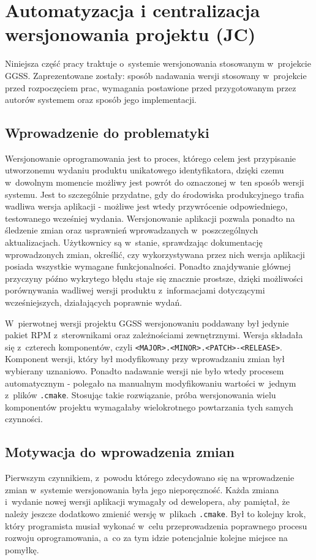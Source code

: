 \clearpage
\section{Automatyzacja i centralizacja wersjonowania projektu (JC)}
\label{ch:versioning}

Niniejsza część pracy traktuje o~systemie wersjonowania stosowanym w~projekcie GGSS. Zaprezentowane zostały: sposób nadawania wersji stosowany w~projekcie przed rozpoczęciem prac, wymagania postawione przed przygotowanym przez autorów systemem oraz sposób jego implementacji.

\subsection{Wprowadzenie do problematyki}
Wersjonowanie oprogramowania jest to proces, którego celem jest przypisanie utworzonemu wydaniu produktu unikatowego identyfikatora, dzięki czemu w~dowolnym momencie możliwy jest powrót do oznaczonej w~ten sposób wersji systemu. Jest to szczególnie przydatne, gdy do środowiska produkcyjnego trafia wadliwa wersja aplikacji - możliwe jest wtedy przywrócenie odpowiedniego, testowanego wcześniej wydania. Wersjonowanie aplikacji pozwala ponadto na śledzenie zmian oraz usprawnień wprowadzanych w~poszczególnych aktualizacjach. Użytkownicy są w~stanie, sprawdzając dokumentację wprowadzonych zmian, określić, czy wykorzystywana przez nich wersja aplikacji posiada wszystkie wymagane funkcjonalności. Ponadto znajdywanie głównej przyczyny późno wykrytego błędu staje się znacznie prostsze, dzięki możliwości porównywania wadliwej wersji produktu z~informacjami dotyczącymi wcześniejszych, działających poprawnie wydań.

W~pierwotnej wersji projektu GGSS wersjonowaniu poddawany był jedynie pakiet RPM z~sterownikami oraz zależnościami zewnętrznymi. Wersja składała się z~czterech komponentów, czyli \lstinline{<MAJOR>.<MINOR>.<PATCH>-<RELEASE>}. Komponent wersji, który był modyfikowany przy wprowadzaniu zmian był wybierany uznaniowo. Ponadto nadawanie wersji nie było wtedy procesem automatycznym - polegało na manualnym modyfikowaniu wartości w~jednym z~plików \lstinline{.cmake}. Stosując takie rozwiązanie, próba wersjonowania wielu komponentów projektu wymagałaby wielokrotnego powtarzania tych samych czynności.

\subsection{Motywacja do wprowadzenia zmian}
Pierwszym czynnikiem, z~powodu którego zdecydowano się na wprowadzenie zmian w~systemie wersjonowania była jego nieporęczność. Każda zmiana i~wydanie nowej wersji aplikacji wymagały od dewelopera, aby pamiętał, że należy jeszcze dodatkowo zmienić wersję w~plikach \lstinline{.cmake}. Był to kolejny krok, który programista musiał wykonać w~celu przeprowadzenia poprawnego procesu rozwoju oprogramowania, a~co za tym idzie potencjalnie kolejne miejsce na pomyłkę. 

